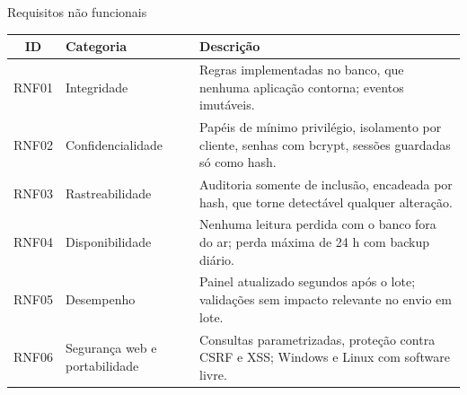 \begin{quadro}[htb]
  \caption{Requisitos não funcionais}\label{qua:rnf}
  \footnotesize
  \begin{tabularx}{\textwidth}{|c|L{2.6cm}|Y|}
    \hline
    \textbf{ID} & \textbf{Categoria} & \textbf{Descrição} \\ \hline
    RNF01 & Integridade & Regras implementadas no banco, que nenhuma aplicação contorna; eventos imutáveis. \\ \hline
    RNF02 & Confidencialidade & Papéis de mínimo privilégio, isolamento por cliente, senhas com bcrypt, sessões guardadas só como hash. \\ \hline
    RNF03 & Rastreabilidade & Auditoria somente de inclusão, encadeada por hash, que torne detectável qualquer alteração. \\ \hline
    RNF04 & Disponibilidade & Nenhuma leitura perdida com o banco fora do ar; perda máxima de 24 h com backup diário. \\ \hline
    RNF05 & Desempenho & Painel atualizado segundos após o lote; validações sem impacto relevante no envio em lote. \\ \hline
    RNF06 & Segurança web e portabilidade & Consultas parametrizadas, proteção contra CSRF e XSS; Windows e Linux com software livre. \\ \hline
  \end{tabularx}
\end{quadro}
